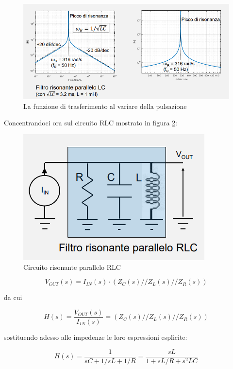 \documentclass{article}
\begin{document}
\begin{figure}[h]
  \centering
  \includegraphics[scale=0.55]{IM_circuito_risonante_parallelo_LC_grafici}
  \caption{La funzione di trasferimento al variare della pulsazione}
  \label{Schema_circuito_risonante_parallelo_LC_grafici}
\end{figure}

Concentrandoci ora sul circuito RLC mostrato in figura \ref{Schema_circuito_risonante_parallelo_RLC}:

\begin{figure}[h]
  \centering
  \includegraphics[scale=0.5]{IM_circuito_risonante_parallelo_RLC}
  \caption{Circuito risonante parallelo RLC}
  \label{Schema_circuito_risonante_parallelo_RLC}
\end{figure}

\[V_{OUT}(s) = I_{IN}(s) \cdot (Z_C(s) // Z_L (s) // Z_R (s))\]

da cui

\[H(s) = \frac{V_{OUT} (s)}{I_{IN} (s)} = (Z_C(s) // Z_L (s) // Z_R (s))\]

sostituendo adesso alle impedenze le loro espressioni esplicite:

\[H(s) = \frac{1}{sC + 1/sL + 1/R} = \frac{sL}{1 + sL/R + s^2 LC}\]
\end{document}
